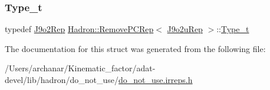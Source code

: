 \mbox{\label{structHadron_1_1RemovePCRep_3_01J9o2uRep_01_4_a572fc7879fdcb65d910768ea4cbd0dd4}} 
\subsubsection{\texorpdfstring{Type\_t}{Type\_t}\hspace{0.1cm}{\footnotesize\ttfamily [2/2]}}
{\footnotesize\ttfamily typedef \mbox{\hyperlink{structHadron_1_1J9o2Rep}{J9o2\+Rep}} \mbox{\hyperlink{structHadron_1_1RemovePCRep}{Hadron\+::\+Remove\+P\+C\+Rep}}$<$ \mbox{\hyperlink{structHadron_1_1J9o2uRep}{J9o2u\+Rep}} $>$\+::\mbox{\hyperlink{structHadron_1_1RemovePCRep_3_01J9o2uRep_01_4_a572fc7879fdcb65d910768ea4cbd0dd4}{Type\+\_\+t}}}



The documentation for this struct was generated from the following file\+:\begin{DoxyCompactItemize}
\item 
/\+Users/archanar/\+Kinematic\+\_\+factor/adat-\/devel/lib/hadron/do\+\_\+not\+\_\+use/\mbox{\hyperlink{adat-devel_2lib_2hadron_2do__not__use_2do__not__use_8irreps_8h}{do\+\_\+not\+\_\+use.\+irreps.\+h}}\end{DoxyCompactItemize}
